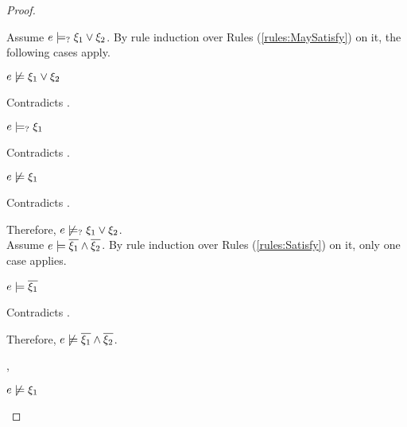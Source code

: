 \begin{proof}
\begin{byCases}
\begin{byCases}
\begin{pfsteps*}
        \end{pfsteps*}
        Assume $e \models_{?} \xi_1 \vee \xi_2$. By rule induction over Rules (\ref{rules:MaySatisfy}) on it, the following cases apply.
        \begin{byCases}
        \item[\text{(\ref{rule:CMSNotVal})}]
            \begin{pfsteps*}
            \item $e \not\models \xi_1 \vee \xi_2$ 
            \end{pfsteps*}
            Contradicts .
        \item[\text{(\ref{rule:CMSOr1})}]
            \begin{pfsteps*}
            \item $e \models_{?} \xi_1$ 
            \end{pfsteps*}
            Contradicts .
        \item[\text{(\ref{rule:CMSOr2})}]
            \begin{pfsteps*}
            \item $e \not\models \xi_1$ 
            \end{pfsteps*}
            Contradicts .
        \end{byCases}
        Therefore, $e \not\models_{?} \xi_1 \vee \xi_2$. \\
        Assume $e \models \overline{\xi_1} \wedge \overline{\xi_2}$. By rule induction over Rules (\ref{rules:Satisfy}) on it, only one case applies.
        \begin{byCases}
        \item[\text{(\ref{rule:CSAnd})}]
            \begin{pfsteps*}
            \item $e \models \overline{\xi_1}$ 
            \end{pfsteps*}
            Contradicts .
        \end{byCases}
        Therefore, $e \not\models \overline{\xi_1} \wedge \overline{\xi_2}$.
    \item[\cmaysatisfy{e}{\xi_1},\csatisfy{e}{\xi_2}]
        \begin{pfsteps*}
        \item $e \not\models \xi_1$  

\end{pfsteps*}
\end{byCases}
\end{byCases}
\end{proof}
